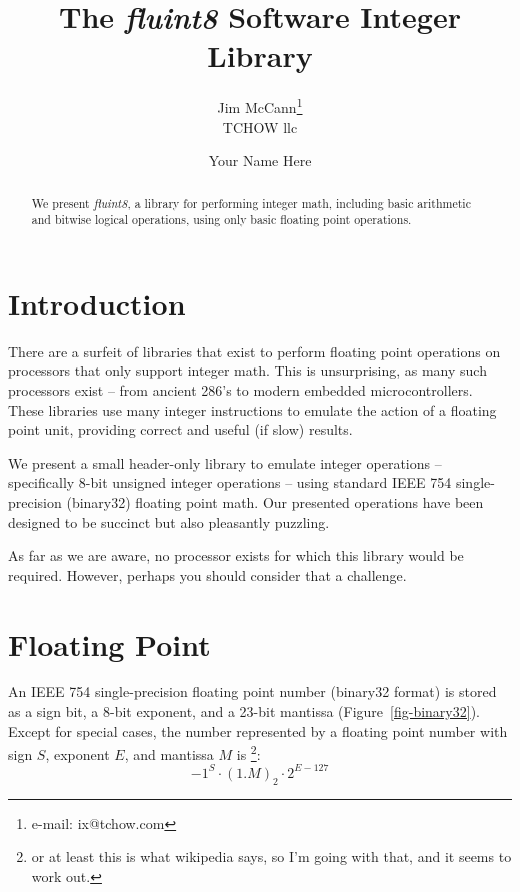 \documentclass{acmsiggraph}
\title{The {\em fluint8} Software Integer Library}
\author{Jim McCann\thanks{e-mail: ix@tchow.com}\\TCHOW llc \and Your Name Here}
\theoremstyle{remark}
\theoremstyle{definition}
\begin{document}
\maketitle

\begin{abstract}
We present {\em fluint8}, a library for performing integer math, including basic arithmetic and bitwise logical operations, using only basic floating point operations.
\end{abstract}

\begin{CRcatlist}
\end{CRcatlist}

\section{Introduction}
There are a surfeit of libraries that exist to perform floating point operations on processors that only support integer math.
This is unsurprising, as many such processors exist -- from ancient 286's to modern embedded microcontrollers.
These libraries use many integer instructions to emulate the action of a floating point unit, providing correct and useful (if slow) results.

We present a small header-only library to emulate integer operations -- specifically 8-bit unsigned integer operations -- using standard IEEE 754 single-precision (binary32) floating point math.
Our presented operations have been designed to be succinct but also pleasantly puzzling.

As far as we are aware, no processor exists for which this library would be required.
However, perhaps you should consider that a challenge.

\section{Floating Point}
An IEEE 754 single-precision floating point number (binary32 format) is stored as a sign bit, a 8-bit exponent, and a 23-bit mantissa (Figure~\ref{fig-binary32}).
Except for special cases, the number represented by a floating point number with sign $S$, exponent $E$, and mantissa $M$ is
\footnote{or at least this is what wikipedia says, so I'm going with that, and it seems to work out.}:
\begin{displaymath}
-1^{S}\cdot (1.M)_2 \cdot 2^{E-127}
\end{displaymath}
\end{document}
